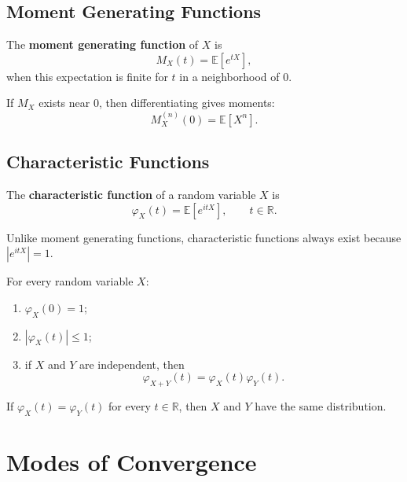 \subsection{Moment Generating Functions}

\begin{definition}
The \textbf{moment generating function} of $X$ is
\[
    M_X(t)=\mathbb{E}[e^{tX}],
\]
when this expectation is finite for $t$ in a neighborhood of $0$.
\end{definition}

\begin{remark}
If $M_X$ exists near $0$, then differentiating gives moments:
\[
    M_X^{(n)}(0)=\mathbb{E}[X^n].
\]
\end{remark}

\subsection{Characteristic Functions}

\begin{definition}
The \textbf{characteristic function} of a random variable $X$ is
\[
    \varphi_X(t)=\mathbb{E}[e^{itX}],
    \qquad t\in\mathbb{R}.
\]
\end{definition}

Unlike moment generating functions, characteristic functions always exist because $|e^{itX}|=1$.

\begin{proposition}
For every random variable $X$:
\begin{enumerate}
    \item $\varphi_X(0)=1$;
    \item $|\varphi_X(t)|\leq 1$;
    \item if $X$ and $Y$ are independent, then
    \[
        \varphi_{X+Y}(t)=\varphi_X(t)\varphi_Y(t).
    \]
\end{enumerate}
\end{proposition}

\begin{theorem}
If $\varphi_X(t)=\varphi_Y(t)$ for every $t\in\mathbb{R}$, then $X$ and $Y$ have the same distribution.
\end{theorem}

\section{Modes of Convergence}


